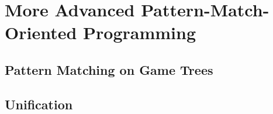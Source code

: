 \chapter{More Advanced Pattern-Match-Oriented Programming}\label{advanced}

\section{Pattern Matching on Game Trees}\label{advanced-tree}

\section{Unification}\label{advanced-unify}
